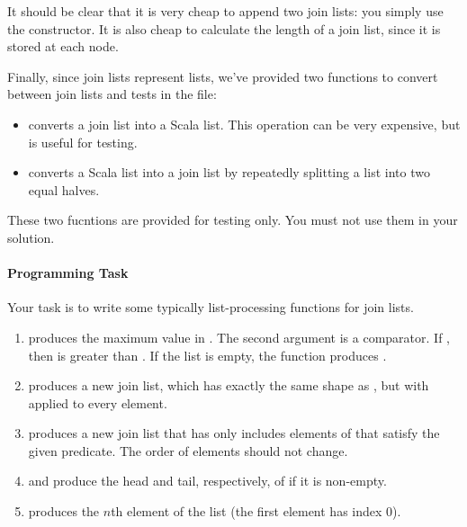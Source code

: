 \documentclass{book}
\begin{document}
It should be clear that it is very cheap to append two join lists: you simply
use the  constructor. It is also cheap to calculate the length of a
join list, since it is stored at each node.


Finally, since join lists represent lists, we've provided two
functions to convert between join lists and tests in the
 file:

\begin{itemize}

\item {} converts a join list into a Scala
  list.  This
  operation can be very expensive, but is useful for testing.

\item {} converts a Scala list into a join
  list by repeatedly splitting a list into two equal halves.

\end{itemize}

These two fucntions are provided for testing only. You must not use them in your
solution.

\paragraph{Programming Task}

Your task is to write some typically list-processing functions for join lists.

\begin{enumerate}

\item {} produces the maximum value in
  . The second argument is a comparator. If
  , then  is greater than
  . If the list is empty, the function produces
   .

\item {} produces a new join list, which has exactly the same
 shape as , but with  applied to every element.

\item {} produces a new join list that has only
  includes elements of  that satisfy the given predicate.
  The order of elements should not change.

\item {} and  produce the head and tail, respectively,
   of  if it is non-empty.

\item {} produces the $n$th element of the list (the first element has index 0).

\end{enumerate}
\end{document}
